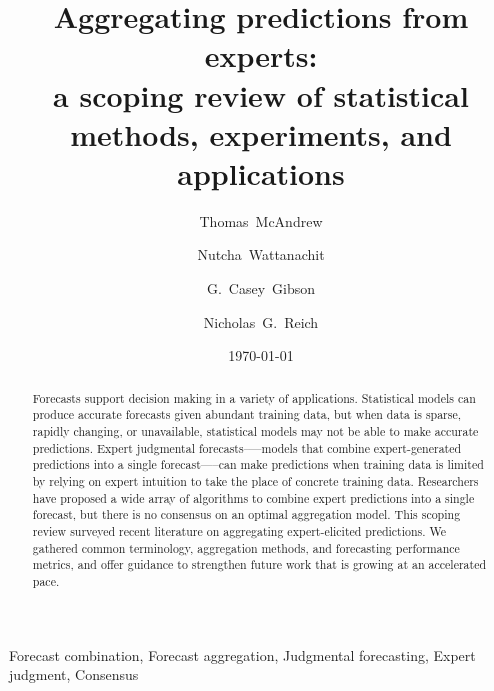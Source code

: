 \documentclass[preprint,authoryear]{elsarticle}
\date{\today}
\begin{document}
   \begin{frontmatter}

     \title{Aggregating predictions from experts: \\ a scoping review of statistical methods, experiments, and applications}

     \author[1]{Thomas~McAndrew }
     
     \author[1]{Nutcha~Wattanachit}

     \author[1]{G.~Casey~Gibson}
     
     \author[1]{Nicholas~G.~Reich}
     
     
     
      \address[1]{Department of Biostatistics and Epidemiology, School of Public Health and Health Sciences, University of Massachusetts at Amherst, Amherst, Massachusetts, USA}

\begin{abstract}
  Forecasts support decision making in a variety of applications.
  Statistical models can produce accurate forecasts given abundant training data, but when data is sparse, rapidly changing, or unavailable, statistical models may not be able to make accurate predictions.
  Expert judgmental forecasts--—models that combine expert-generated predictions into a single forecast—--can make predictions when training data is limited by relying on expert intuition to take the place of concrete training data.
  Researchers have proposed a wide array of algorithms to combine expert predictions into a single forecast, but there is no consensus on an optimal aggregation model.
  This scoping review surveyed recent literature on aggregating expert-elicited predictions.
  We gathered common terminology, aggregation methods, and forecasting performance metrics, and offer guidance to strengthen future work that is growing at an accelerated pace.
\end{abstract}

\begin{keyword}
Forecast combination, Forecast aggregation, Judgmental forecasting, Expert judgment, Consensus 
\end{keyword}

\end{frontmatter}
\end{document}
